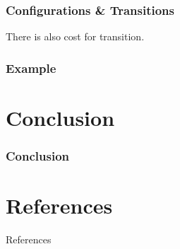 \documentclass{beamer}
\begin{document}
\begin{frame}
  \frametitle{Configurations \& Transitions}
  \vspace*{\fill}
  There is also cost for transition.
\end{frame}

\begin{frame}
  \frametitle{Example}
\end{frame}


\section*{Conclusion}
\begin{frame}
  \frametitle{Conclusion}
\end{frame}


\appendix
\section*{References}
\begin{frame}[allowframebreaks]{References}
  
  
\end{frame}
\end{document}
